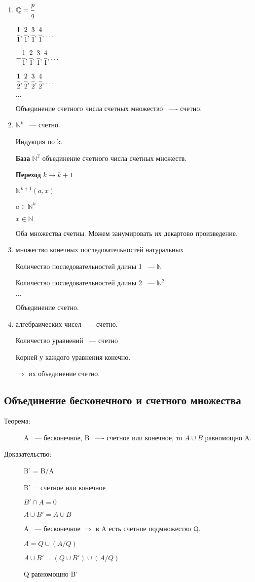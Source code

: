 \documentclass[12pt]{article}
\begin{document}
\begin{enumerate}
\item $\mathbb Q = \cfrac{p}{q}$

$\cfrac{1}{1}, \cfrac{2}{1}, \cfrac{3}{1}, \cfrac{4}{1}, \ldots$

$-\cfrac{1}{1}, \cfrac{2}{1}, \cfrac{3}{1}, \cfrac{4}{1}, \ldots$

$\cfrac{1}{2}, \cfrac{2}{2}, \cfrac{3}{2}, \cfrac{4}{2}, \ldots$

$\ldots$

Объединение счетного числа счетных множество ~---- счетно.

\item $\mathbb N^k$ ~--- счетно.

Индукция по k.

{\bf База} $\mathbb N^2$ объединение счетного числа счетных множеств.

{\bf Переход} $k \to k + 1$

$\mathbb N^{k + 1} (a, x)$

$a \in \mathbb N^k$

$x \in \mathbb N$

Оба множества счетны. Можем занумировать их декартово произведение.

\item множество конечных последовательностей натуральных 

Количество последовательностей длины 1 ~--- $\mathbb N$

Количество последовательностей длины 2 ~--- $\mathbb N^2$

$\ldots$

Объединение счетно. 

\item алгебраических чисел ~--- счетно.

Количество уравнений ~--- счетно

Корней у каждого уравнения конечно. 

$\Rightarrow$ их объединение счетно. 
\end{enumerate}

\subsection{Объединение бесконечного и счетного множества}

\begin{description}
\item[Теорема:] A ~--- бесконечное, B ~---- счетное или конечное, то $A \cup B$ равномощно A.
\item[Доказательство:] 

B' = B/A

B' = счетное или конечное

$B' \cap A = 0$

$A \cup B' = A \cup B$

A ~--- бесконечное $\Rightarrow$ в A есть счетное подмножество Q.

$A = Q \cup (A/Q)$

$A \cup B' = (Q \cup B') \cup (A / Q)$

Q равномощно B'
\end{description}
\end{document}
